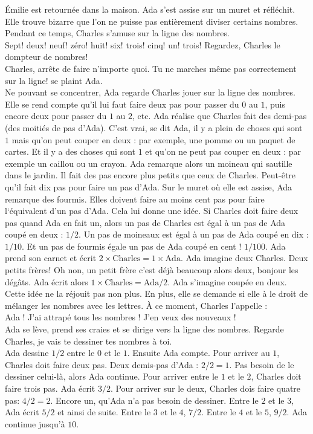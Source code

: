 Émilie est retournée dans la maison. 
Ada s’est assise sur un muret et réfléchit. 
Elle trouve bizarre que l'on ne puisse pas entièrement diviser certains nombres. 
Pendant ce temps, Charles s’amuse sur la ligne des nombres. \\
\guillemotleft Sept! deux! neuf! zéro! huit! six! trois! cinq! un! trois! Regardez, Charles le dompteur de nombres! \\
\mdash Charles, arrête de faire n'importe quoi. Tu ne marches même pas correctement sur la ligne! se plaint Ada. \guillemotright \\
Ne pouvant se concentrer, Ada regarde Charles jouer sur la ligne des nombres. Elle se rend compte qu'il lui faut faire deux pas pour passer du $0$ au $1$, puis encore deux pour passer du $1$ au $2$, etc. Ada réalise que Charles fait des demi-pas (des moitiés de pas d'Ada). 
C’est vrai, se dit Ada, il y a plein de choses qui sont $1$ mais qu’on peut couper en deux : par exemple, une pomme ou un paquet de cartes. Et il y a des choses qui sont $1$ et qu’on ne peut pas couper en deux : par exemple un caillou ou un crayon.
Ada remarque alors un moineau qui sautille dans le jardin. Il fait des pas encore plus petits que ceux de Charles. Peut-être qu'il fait dix pas pour faire un pas d'Ada. Sur le muret où elle est assise, Ada remarque des fourmis. Elles doivent faire au moins cent pas pour faire l‘équivalent d’un pas d'Ada.
Cela lui donne une idée. Si Charles doit faire deux pas quand Ada en fait un, alors un pas de Charles est égal à un pas de Ada coupé en deux : $1/2$. Un pas de moineaux est égal à un pas de Ada coupé en dix : $1/10$. Et un pas de fourmis égale un pas de Ada coupé en cent ! $1/100$.
Ada prend son carnet et écrit $2 \times \mathrm{Charles} = 1 \times \mathrm{Ada}$. Ada imagine deux Charles. Deux petits frères! Oh non, un petit frère c’est déjà beaucoup alors deux, bonjour les dégâts. Ada écrit alors $1 \times \mathrm{Charles} = \mathrm{Ada} / 2$. Ada s’imagine coupée en deux. Cette idée ne la réjouit pas non plus. En plus, elle se demande si elle à le droit de mélanger les nombres avec les lettres.
À ce moment, Charles l’appelle : \\
\guillemotleft Ada ! J’ai attrapé tous les nombres ! J’en veux des nouveaux ! \guillemotright \\
Ada se lève, prend ses craies et se dirige vers la ligne des nombres.
\guillemotleft Regarde Charles, je vais te dessiner tes nombres à toi. \guillemotright \\
Ada dessine $1/2$ entre le $0$ et le $1$. Ensuite Ada compte. Pour arriver au $1$, Charles doit faire deux pas. Deux demis-pas d’Ada : $2/2 = 1$. Pas besoin de le dessiner celui-là, alors Ada continue. Pour arriver entre le $1$ et le $2$, Charles doit faire trois pas. Ada écrit $3/2$. Pour arriver sur le deux, Charles dois faire quatre pas: $4/2 = 2$. Encore un, qu’Ada n’a pas besoin de dessiner. Entre le $2$ et le $3$, Ada écrit $5/2$ et ainsi de suite. Entre le $3$ et le $4$, $7/2$. Entre le $4$ et le $5$, $9/2$. Ada continue jusqu'à $10$. 
